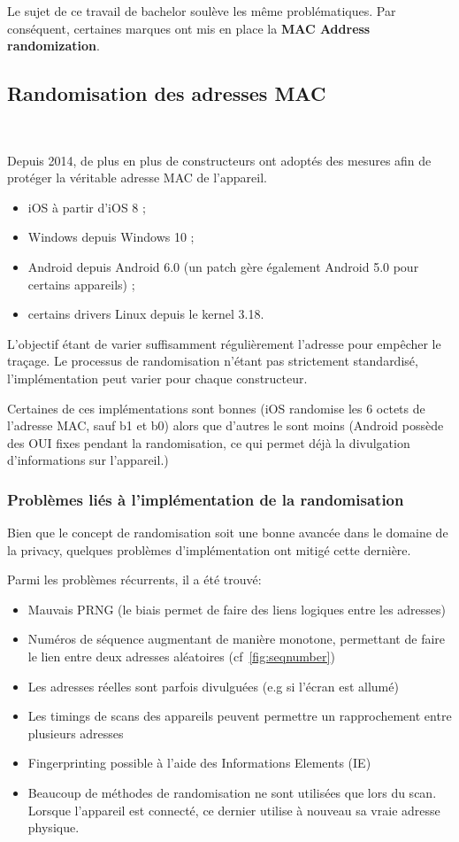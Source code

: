 Le sujet de ce travail de bachelor soulève les même problématiques. Par conséquent, certaines marques
ont mis en place la \textbf{MAC Address randomization}.

\subsection{Randomisation des adresses MAC}~\cite{connected:macrandom}

Depuis 2014, de plus en plus de constructeurs ont adoptés des mesures
afin de protéger la véritable adresse MAC de l'appareil. 

\begin{itemize}
    \item iOS à partir d’iOS 8 ;
    \item Windows depuis Windows 10 ;
    \item Android depuis Android 6.0 (un patch gère également Android 5.0 pour certains appareils) ;
    \item certains drivers Linux depuis le kernel 3.18.
\end{itemize}

L'objectif étant de varier suffisamment régulièrement l'adresse pour empêcher le traçage. 
Le processus de randomisation n'étant pas strictement standardisé, l'implémentation peut varier pour chaque constructeur. 

Certaines de ces implémentations sont bonnes (iOS randomise les 6 octets de l'adresse MAC, sauf b1 et b0) alors que d'autres le sont moins (Android possède des OUI fixes pendant la randomisation, ce qui 
permet déjà la divulgation d'informations sur l'appareil.)

\subsubsection{Problèmes liés à l'implémentation de la randomisation}

Bien que le concept de randomisation soit une bonne avancée dans le domaine de la privacy, quelques
problèmes d'implémentation ont mitigé cette dernière. 

Parmi les problèmes récurrents, il a été trouvé:
\begin{itemize}
	\item Mauvais PRNG (le biais permet de faire des liens logiques entre les adresses)
	\item Numéros de séquence augmentant de manière monotone, permettant de faire le lien entre deux adresses aléatoires (cf~\ref{fig:seqnumber})
	\item Les adresses réelles sont parfois divulguées (e.g si l'écran est allumé)
	\item Les timings de scans des appareils peuvent permettre un rapprochement entre plusieurs adresses
	\item Fingerprinting possible à l'aide des Informations Elements (IE)
	\item Beaucoup de méthodes de randomisation ne sont utilisées que lors du scan. Lorsque l'appareil est connecté, ce dernier utilise à nouveau
	sa vraie adresse physique.
\end{itemize} 

